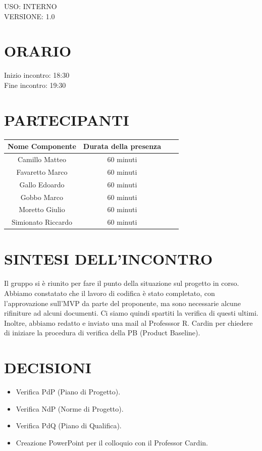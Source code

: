 \documentclass[5pt]{article}
\begin{document}
\begin{flushright}
    \begin{spacing}{1}
        USO: INTERNO\\
        VERSIONE: 1.0\\
    \end{spacing}
\end{flushright}


\restoregeometry

\pagebreak


\section{ORARIO}
\begin{spacing}{1.5}
    {\large Inizio incontro: 18:30}\\
    {\large Fine incontro: 19:30} 
\end{spacing}

\section{PARTECIPANTI}
\setlength\cellspacetoplimit{6pt}
\setlength\cellspacebottomlimit{6pt}

\begin{table}[ht]
  \begin{tabular}{|Sc|Sc|}
    \hline
    \textbf{Nome Componente} & \textbf{Durata della presenza} \\
    \hline
    Camillo Matteo & 60 minuti \\
    Favaretto Marco & 60 minuti \\
    Gallo Edoardo & 60 minuti \\
    Gobbo Marco & 60 minuti \\
    Moretto Giulio & 60 minuti \\
    Simionato Riccardo & 60 minuti \\
    \hline
  \end{tabular}
  \label{tab:conference}
\end{table}

\section{SINTESI DELL'INCONTRO}
Il gruppo si è riunito per fare il punto della situazione sul progetto in corso. Abbiamo constatato che il lavoro di codifica è stato completato, con l'approvazione sull'MVP da parte del proponente, ma sono necessarie alcune rifiniture ad alcuni documenti. Ci siamo quindi spartiti la verifica di questi ultimi. Inoltre, abbiamo redatto e inviato una mail al Professsor R. Cardin per chiedere di iniziare la procedura di verifica della PB (Product Baseline).

\section{DECISIONI}
\begin{itemize}
    \item Verifica PdP (Piano di Progetto).
    \item Verifica NdP (Norme di Progetto).
    \item Verifica PdQ (Piano di Qualifica).
    \item Creazione PowerPoint per il colloquio con il Professor Cardin.
\end{itemize}
\end{document}
